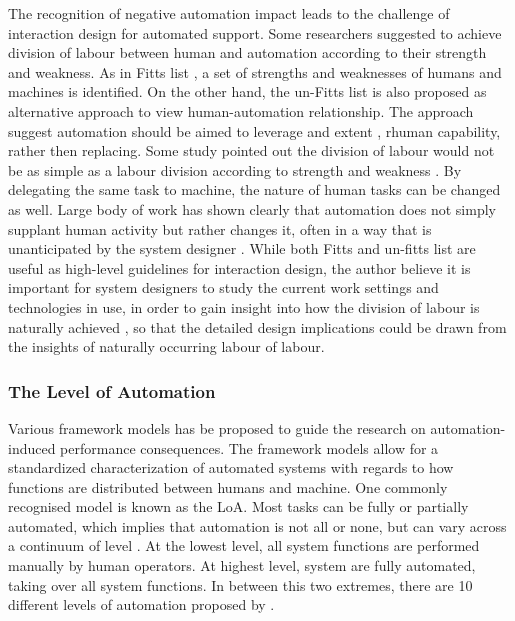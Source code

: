 The recognition of negative automation impact leads to the challenge of interaction design for automated support.  Some researchers suggested to achieve division of labour between human and automation according to their strength and weakness. As in Fitts list \cite{Fitts} , a set of strengths and weaknesses of humans and machines is identified. On the other hand, the un-Fitts list \cite{Hoffman2002} is also proposed as alternative approach to view human-automation relationship. The approach suggest automation should be aimed to leverage and extent , rhuman capability, rather then replacing. Some study pointed out the division of labour would not be as simple as a labour division according to strength and weakness \cite{Bradshaw2011}. By delegating the same task to machine, the nature of human tasks can be changed as well. Large body of work has shown clearly that automation does not simply supplant human activity but rather changes it, often in a way that is unanticipated by the system designer \cite{Bradshaw2011}. While both Fitts and un-fitts list are useful as high-level guidelines for interaction design, the author believe it is important for system designers to study the current work settings and technologies in use, in order to gain insight into how the division of labour is naturally achieved \cite{Crabtree2012}, so that the detailed design implications could be drawn from the insights of naturally occurring labour of labour. \\


\subsubsection{The Level of Automation}\label{sec:lrloa}
Various framework models has be proposed to guide the research on automation-induced performance consequences. The framework models allow for a standardized characterization of automated systems with regards to how functions are distributed between humans and machine. One commonly recognised model is known as the \acf{LoA}. Most tasks can be fully or partially automated, which implies that automation is not all or none, but can vary across a continuum of level \cite{Wickens2010}. At the lowest level, all system functions are performed manually by human operators.  At highest level, system are fully automated, taking over all system functions. In between this two extremes, there are 10 different levels of automation proposed by \cite{Wickens2010}. \\

